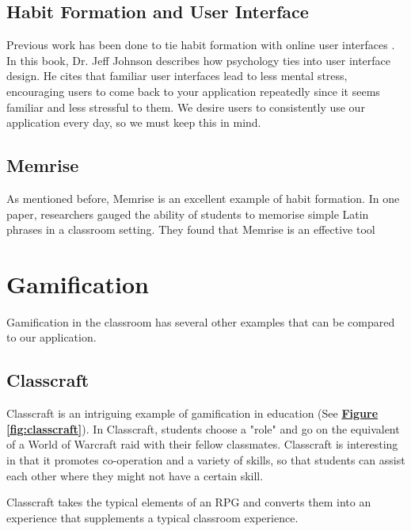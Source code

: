 \subsection{Habit Formation and User Interface}
Previous work has been done to tie habit formation with online user interfaces \cite{johnson2013designing}. In this book, Dr. Jeff Johnson describes how psychology ties into user interface design. He cites that familiar user interfaces lead to less mental stress, encouraging users to come back to your application repeatedly since it seems familiar and less stressful to them. We desire users to consistently use our application every day, so we must keep this in mind.

\subsection{Memrise}
As mentioned before, Memrise is an excellent example of habit formation. In one paper, researchers gauged the ability of students to memorise simple Latin phrases in a classroom setting. They found that Memrise is an effective tool 

\section{Gamification}
Gamification in the classroom has several other examples that can be compared to our application.

\subsection{Classcraft}
Classcraft is an intriguing example of gamification in education (See \textbf{\hyperref[fig:classcraft]{Figure \ref*{fig:classcraft}}}). In Classcraft, students choose a "role" and go on the equivalent of a World of Warcraft raid with their fellow classmates. Classcraft is interesting in that it promotes co-operation and a variety of skills, so that students can assist each other where they might not have a certain skill. 

Classcraft takes the typical elements of an RPG and converts them into an experience that supplements a typical classroom experience.

